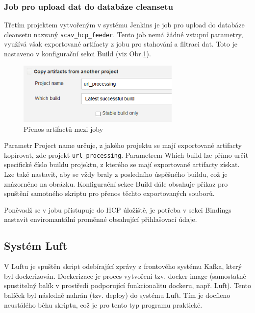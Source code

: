 \documentclass[thesis=M,czech,hidelinks]{FITthesis}[2013/05/06]
\begin{document}
\subsubsection{Job pro upload dat do databáze cleansetu}
Třetím projektem vytvořeným v systému Jenkins je job pro upload do databáze cleansetu nazvaný \texttt{scav_hcp_feeder}. Tento job nemá žádné vstupní parametry, využívá však exportované artifacty z jobu pro stahování a filtraci dat. Toto je nastaveno v konfigurační sekci Build (viz Obr.\ref{fig:jenkins_artifacts}). 

\begin{figure}[h]
	\centering
	\includegraphics[width=8cm]{pictures/jenkins_artifacts.png}
	\caption{Přenos artifactů mezi joby}
	\label{fig:jenkins_artifacts}
\end{figure}

Parametr Project name určuje, z jakého projektu se mají exportované artifacty kopírovat, zde projekt \texttt{url_processing}. Parametrem Which build lze přímo určit specifické číslo buildu projektu, z kterého se mají exportované artifacty získat. Lze také nastavit, aby se vždy braly z posledního úspěšného buildu, což je znázorněno na obrázku. Konfigurační sekce Build dále obsahuje příkaz pro spuštění samotného skriptu pro přenos těchto exportovaných souborů. 

Poněvadž se v jobu přistupuje do HCP úložiště, je potřeba v sekci Bindings nastavit enviromantální proměnné obsahující přihlašovací údaje.



\subsection{Systém Luft}\label{sec:luft}
V Luftu je spuštěn skript odebírající zprávy z frontového systému Kafka, který byl dockerizován. Dockerizace je proces vytvoření tzv. docker image (samostatně spustitelný balík v prostředí podporující funkcionalitu dockeru, např. Luft). Tento balíček byl následně nahrán (tzv. deploy) do systému Luft. Tím je docíleno neustálého běhu skriptu, což je pro tento typ programu praktické.
\end{document}
